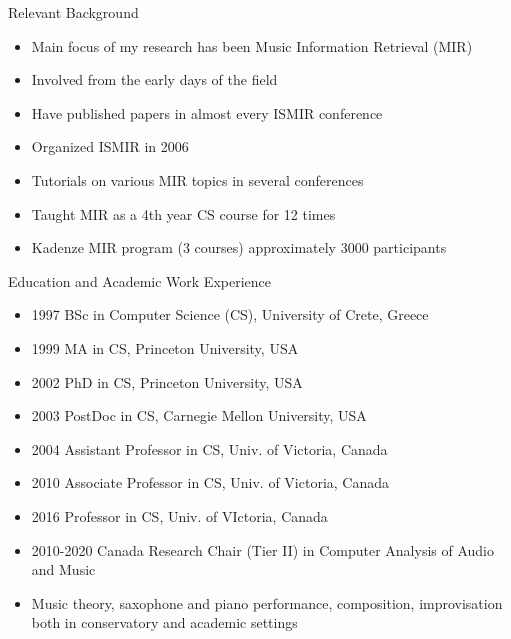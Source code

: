 \documentclass[12pt]{beamer}
\begin{document}
\begin{frame}{Relevant Background} 
\begin{itemize}
\item{Main focus of my research has been Music Information Retrieval (MIR)}
\item{Involved from the early days of the field} 
\item{Have published papers in almost every ISMIR conference}
\item{Organized ISMIR in 2006} 
\item{Tutorials on various MIR topics in several conferences}
\item{Taught MIR as a 4th year CS course for 12 times}
\item{Kadenze MIR program (3 courses) approximately 3000 participants} 
\end{itemize}
\end{frame}



\begin{frame}{Education and Academic Work Experience} 

\begin{itemize} 
\item{1997 BSc in Computer Science (CS), University of Crete, Greece}
\item{1999 MA in CS, Princeton University, USA} 
\item{2002 PhD in CS, Princeton University, USA} 
\item{2003 PostDoc in CS, Carnegie Mellon University, USA}
\item{2004 Assistant Professor in CS, Univ. of Victoria, Canada} 
\item{2010 Associate Professor in CS, Univ. of Victoria, Canada}
\item{2016 Professor in CS, Univ. of VIctoria, Canada}
\item{2010-2020 Canada Research Chair (Tier II) in Computer Analysis of Audio and Music} 
\item{Music theory, saxophone and piano performance, composition,
  improvisation both in conservatory and academic settings}
\end{itemize}
\end{frame} 
\end{document}
